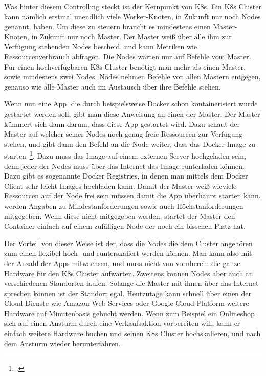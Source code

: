 Was hinter diesem Controlling steckt ist der Kernpunkt von K8s. Ein K8s Cluster kann nämlich erstmal unendlich viele Worker-Knoten, in Zukunft nur noch Nodes genannt, haben. Um diese zu steuern braucht es mindestens
einen Master-Knoten, in Zukunft nur noch Master. Der Master weiß über alle ihm zur Verfügung stehenden Nodes bescheid, und kann Metriken wie Ressourcenverbrauch abfragen. Die Nodes warten nur auf Befehle vom Master.
Für einen hochverfügbaren K8s Cluster benötigt man mehr als einen Master, sowie mindestens zwei Nodes. Nodes nehmen Befehle von allen Mastern entgegen, genauso wie alle Master auch im Austausch über ihre Befehle stehen.

Wenn nun eine App, die durch beispielsweise Docker schon kontainerisiert wurde gestartet werden soll, gibt man diese Anweisung an einen der Master. Der Master kümmert sich dann darum, dass diese App gestartet wird.
Dazu schaut der Master auf welcher seiner Nodes noch genug freie Ressourcen zur Verfügung stehen, und gibt dann den Befehl an die Node weiter, dass das Docker Image zu starten~\footcite[Vgl. ][]{website:kube-pod}. Dazu muss das Image
auf einem externen Server hochgeladen sein, denn jeder der Nodes muss über das Internet das Image runterladen können. Dazu gibt es sogenannte Docker Registries, in denen man mittels dem Docker Client
sehr leicht Images hochladen kann.
Damit der Master weiß wieviele Ressourcen auf der Node frei sein müssen damit die App überhaupt starten kann, werden Angaben zu Mindestanforderungen sowie auch Höchstanforderungen mitgegeben. Wenn diese 
nicht mitgegeben werden, startet der Master den Container einfach auf einem zufälligen Node der noch ein bisschen Platz hat.

Der Vorteil von dieser Weise ist der, dass die Nodes die dem Cluster angehören zum einen flexibel hoch- und runterskaliert werden können. Man kann also mit der Anzahl der Apps mitwachsen, und muss nicht von vornherein die ganze Hardware
für den K8s Cluster aufwarten. Zweitens können Nodes aber auch an verschiedenen Standorten laufen. Solange die Master mit ihnen über das Internet sprechen können ist der Standort egal.
Heutzutage kann schnell über einen der Cloud-Dienste wie Amazon Web Services oder Google Cloud Platform weitere Hardware auf Minutenbasis gebucht werden. Wenn zum Beispiel ein Onlineshop sich auf einen
Ansturm durch eine Verkaufsaktion vorbereiten will, kann er einfach weitere Hardware buchen und seinen K8s Cluster hochskalieren, und nach dem Ansturm wieder herunterfahren.

